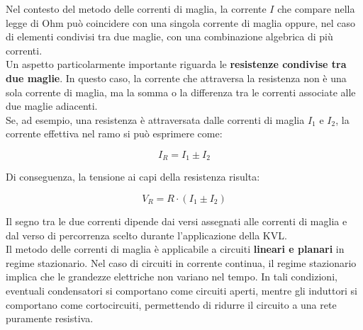 Nel contesto del metodo delle correnti di maglia, la corrente $I$ che compare nella legge di Ohm può coincidere con una singola corrente di maglia oppure, nel caso di elementi condivisi tra due maglie, con una combinazione algebrica di più correnti.\\
Un aspetto particolarmente importante riguarda le \textbf{resistenze condivise tra due maglie}. In questo caso, la corrente che attraversa la resistenza non è una sola corrente di maglia, ma la somma o la differenza tra le correnti associate alle due maglie adiacenti. \\

Se, ad esempio, una resistenza è attraversata dalle correnti di maglia $I_1$ e $I_2$, la corrente effettiva nel ramo si può esprimere come:

\begin{equation}
    I_R = I_1 \pm I_2
    \label{eq:res_condivisa}
\end{equation}

Di conseguenza, la tensione ai capi della resistenza risulta:

\begin{equation}
    V_R = R \cdot (I_1 \pm I_2)
    \label{eq:tensione_condivisa}
\end{equation}

Il segno tra le due correnti dipende dai versi assegnati alle correnti di maglia e dal verso di percorrenza scelto durante l'applicazione della KVL.\\

Il metodo delle correnti di maglia è applicabile a circuiti \textbf{lineari e planari} in regime stazionario. Nel caso di circuiti in corrente continua, il regime stazionario implica che le grandezze elettriche non variano nel tempo. In tali condizioni, eventuali condensatori si comportano come circuiti aperti, mentre gli induttori si comportano come cortocircuiti, permettendo di ridurre il circuito a una rete puramente resistiva.

\begin{center}
\end{center}
